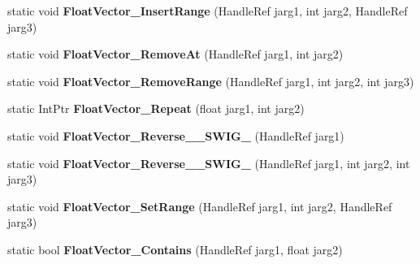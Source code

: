 \begin{DoxyCompactItemize}
\item 
\hypertarget{class_assimp_p_i_n_v_o_k_e_ad8a741862163a278306bbeddf33e5328}{static void {\bfseries Float\+Vector\+\_\+\+Insert\+Range} (Handle\+Ref jarg1, int jarg2, Handle\+Ref jarg3)}\label{class_assimp_p_i_n_v_o_k_e_ad8a741862163a278306bbeddf33e5328}

\item 
\hypertarget{class_assimp_p_i_n_v_o_k_e_a6671ee3c49144bfa38cc0673c8e07f11}{static void {\bfseries Float\+Vector\+\_\+\+Remove\+At} (Handle\+Ref jarg1, int jarg2)}\label{class_assimp_p_i_n_v_o_k_e_a6671ee3c49144bfa38cc0673c8e07f11}

\item 
\hypertarget{class_assimp_p_i_n_v_o_k_e_a47c947cb09f33f021501dd1500b5fa20}{static void {\bfseries Float\+Vector\+\_\+\+Remove\+Range} (Handle\+Ref jarg1, int jarg2, int jarg3)}\label{class_assimp_p_i_n_v_o_k_e_a47c947cb09f33f021501dd1500b5fa20}

\item 
\hypertarget{class_assimp_p_i_n_v_o_k_e_ad7821c27aedae3c4d041bad06630b6d8}{static Int\+Ptr {\bfseries Float\+Vector\+\_\+\+Repeat} (float jarg1, int jarg2)}\label{class_assimp_p_i_n_v_o_k_e_ad7821c27aedae3c4d041bad06630b6d8}

\item 
\hypertarget{class_assimp_p_i_n_v_o_k_e_aad2a4586b52b846d1aca5a5a6c9eae40}{static void {\bfseries Float\+Vector\+\_\+\+Reverse\+\_\+\+\_\+\+S\+W\+I\+G\+\_} (Handle\+Ref jarg1)}\label{class_assimp_p_i_n_v_o_k_e_aad2a4586b52b846d1aca5a5a6c9eae40}

\item 
\hypertarget{class_assimp_p_i_n_v_o_k_e_a34324dba5adcc3a3a34a612314c787b6}{static void {\bfseries Float\+Vector\+\_\+\+Reverse\+\_\+\+\_\+\+S\+W\+I\+G\+\_} (Handle\+Ref jarg1, int jarg2, int jarg3)}\label{class_assimp_p_i_n_v_o_k_e_a34324dba5adcc3a3a34a612314c787b6}

\item 
\hypertarget{class_assimp_p_i_n_v_o_k_e_abb91980db06dcd98c4687e2f12fedac1}{static void {\bfseries Float\+Vector\+\_\+\+Set\+Range} (Handle\+Ref jarg1, int jarg2, Handle\+Ref jarg3)}\label{class_assimp_p_i_n_v_o_k_e_abb91980db06dcd98c4687e2f12fedac1}

\item 
\hypertarget{class_assimp_p_i_n_v_o_k_e_ad3a143d9a3e2d1e9b598ce27c7998e77}{static bool {\bfseries Float\+Vector\+\_\+\+Contains} (Handle\+Ref jarg1, float jarg2)}\label{class_assimp_p_i_n_v_o_k_e_ad3a143d9a3e2d1e9b598ce27c7998e77}


\end{DoxyCompactItemize}
